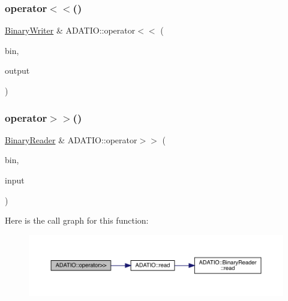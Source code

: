 \subsubsection{\texorpdfstring{operator$<$$<$()}{operator<<()}\hspace{0.1cm}{\footnotesize\ttfamily [12/12]}}
{\footnotesize\ttfamily \mbox{\hyperlink{classADATIO_1_1BinaryWriter}{Binary\+Writer}} \& A\+D\+A\+T\+I\+O\+::operator$<$$<$ (\begin{DoxyParamCaption}\item[{\mbox{\hyperlink{classADATIO_1_1BinaryWriter}{Binary\+Writer}} \&}]{bin,  }\item[{char}]{output }\end{DoxyParamCaption})}

\mbox{\label{namespaceADATIO_aa4d9d42917828a10055400b295736ad5}} 
\subsubsection{\texorpdfstring{operator$>$$>$()}{operator>>()}\hspace{0.1cm}{\footnotesize\ttfamily [1/10]}}
{\footnotesize\ttfamily \mbox{\hyperlink{classADATIO_1_1BinaryReader}{Binary\+Reader}} \& A\+D\+A\+T\+I\+O\+::operator$>$$>$ (\begin{DoxyParamCaption}\item[{\mbox{\hyperlink{classADATIO_1_1BinaryReader}{Binary\+Reader}} \&}]{bin,  }\item[{char \&}]{input }\end{DoxyParamCaption})}

Here is the call graph for this function\+:\nopagebreak
\begin{figure}[H]
\begin{center}
\leavevmode
\includegraphics[width=350pt]{d0/dba/namespaceADATIO_aa4d9d42917828a10055400b295736ad5_cgraph}
\end{center}
\end{figure}
\mbox{\label{namespaceADATIO_a38e9b56ea3dfb8ea19ceb57783546c7c}} 

